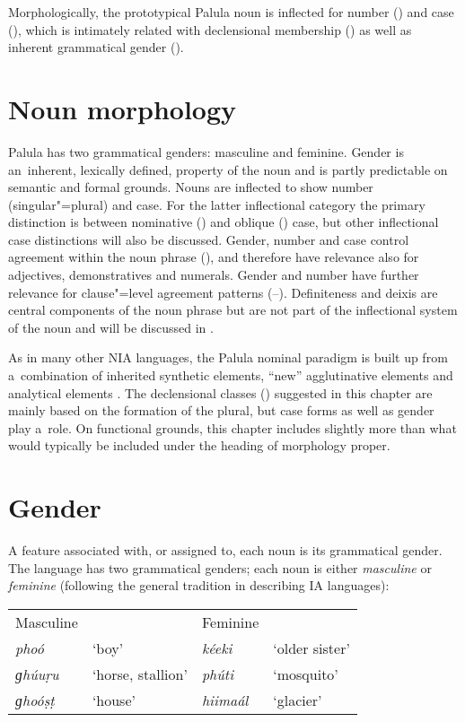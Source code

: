 Morphologically, the prototypical Palula noun is inflected for number () and case (), which is intimately related with declensional membership () as well as inherent grammatical gender (). 


\section{Noun morphology}
\label{sec:4-2}


Palula has two grammatical genders: masculine and feminine. Gender is an~inherent, lexically defined, property of the noun and is partly predictable on semantic and formal grounds. Nouns are inflected to show number (singular"=plural) and case. For the latter inflectional category the primary distinction is between nominative () and oblique () case, but other inflectional case distinctions will also be discussed. Gender, number and case control agreement within the noun phrase (), and therefore have relevance also for adjectives, demonstratives and numerals. Gender and number have further relevance for clause"=level agreement patterns (--). Definiteness and deixis are central components of the noun phrase but are not part of the inflectional system of the noun and will be discussed in .


As in many other NIA languages, the Palula nominal paradigm is built up from a~combination of inherited synthetic elements, ``new'' agglutinative elements and analytical elements \citep[212]{masica1991}. The declensional classes () suggested in this chapter are mainly based on the formation of the plural, but case forms as well as gender play a~role. On functional grounds, this chapter includes slightly more than what would typically be included under the heading of morphology proper.


\section{Gender}
\label{sec:4-3}

A feature associated with, or assigned to, each noun is its grammatical gender. The language has two grammatical genders; each noun is either \textit{masculine} or \textit{feminine} (following the general tradition in describing IA languages): 


\begin{table}[H]
\begin{tabularx}{\textwidth}{ Q Q Q Q }
Masculine &
&
Feminine &
\\
\textit{phoó} &
`boy' &
\textit{kéeki} &
`older sister'\\
\textit{ɡhúuṛu} &
`horse, stallion' &
\textit{phúti} &
`mosquito'\\
\textit{ɡhoóṣṭ} &
`house' &
\textit{hiimaál} &
`glacier'\\
\end{tabularx}
\end{table}

